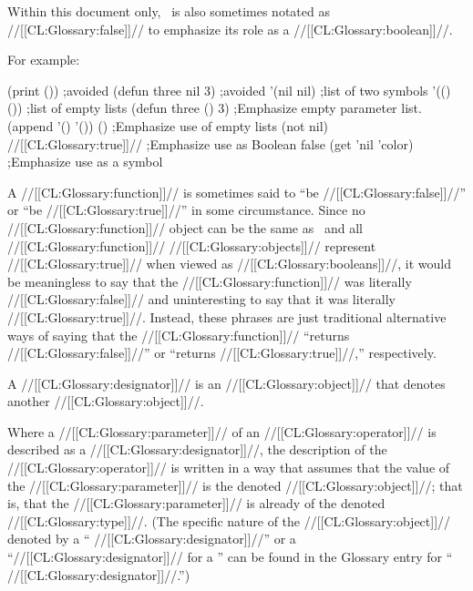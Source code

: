Within this document only, \nil\ is also sometimes notated as //[[CL:Glossary:false]]// to emphasize its role as a //[[CL:Glossary:boolean]]//.

For example:

\code
 (print ())                          ;avoided
 (defun three nil 3)                 ;avoided 
 '(nil nil)                          ;list of two symbols
 '(() ())                            ;list of empty lists
 (defun three () 3)                  ;Emphasize empty parameter list.
 (append '() '()) \EV ()              ;Emphasize use of empty lists
 (not nil) \EV //[[CL:Glossary:true]]//                   ;Emphasize use as Boolean false
 (get 'nil 'color)                   ;Emphasize use as a symbol \endcode

A //[[CL:Glossary:function]]// is sometimes said to ``be //[[CL:Glossary:false]]//'' or ``be //[[CL:Glossary:true]]//'' in some circumstance. Since no //[[CL:Glossary:function]]// object can be the same as \nil\  and all //[[CL:Glossary:function]]// //[[CL:Glossary:objects]]// represent //[[CL:Glossary:true]]// when viewed as //[[CL:Glossary:booleans]]//, it would be meaningless to say that the //[[CL:Glossary:function]]// was literally //[[CL:Glossary:false]]//  and uninteresting to say that it was literally //[[CL:Glossary:true]]//. Instead, these phrases are just traditional alternative ways of saying that the //[[CL:Glossary:function]]// ``returns //[[CL:Glossary:false]]//'' or ``returns //[[CL:Glossary:true]]//,'' respectively.

\endsubsubsubsection%

\endsubsubsection%

 

A //[[CL:Glossary:designator]]// is an //[[CL:Glossary:object]]// that denotes another //[[CL:Glossary:object]]//.

Where a //[[CL:Glossary:parameter]]// of an //[[CL:Glossary:operator]]// is described as a //[[CL:Glossary:designator]]//, the description of the //[[CL:Glossary:operator]]// is written in a way that assumes that the value of the //[[CL:Glossary:parameter]]// is the denoted //[[CL:Glossary:object]]//; that is, that the //[[CL:Glossary:parameter]]// is already of the denoted //[[CL:Glossary:type]]//. (The specific nature of the //[[CL:Glossary:object]]// denoted by
   a `` //[[CL:Glossary:designator]]//'' or a ``//[[CL:Glossary:designator]]// for a ''  can be found in the Glossary entry for `` //[[CL:Glossary:designator]]//.'')

